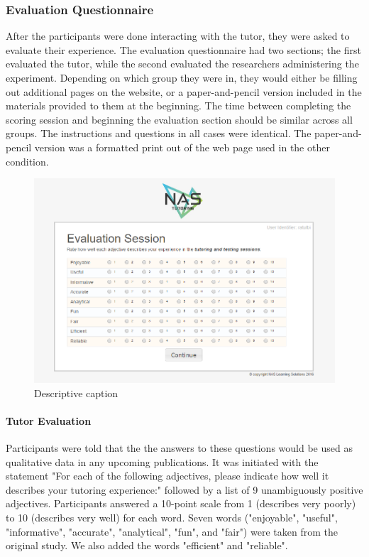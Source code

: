 \documentclass{sig-alternate-05-2015}
\begin{document}
\subsubsection{Evaluation Questionnaire}
After the participants were done interacting with the tutor, they were asked to evaluate their experience.  The evaluation questionnaire had two sections; the first evaluated the tutor, while the second evaluated the researchers administering the experiment.  Depending on which group they were in, they would either be filling out additional pages on the website, or a paper-and-pencil version included in the materials provided to them at the beginning.  The time between completing the scoring session and beginning the evaluation section should be similar across all groups.  The instructions and questions in all cases were identical.  The paper-and-pencil version was a formatted print out of the web page used in the other condition.

\begin{figure}[!h]
    \includegraphics[width=\linewidth]{figures/website/12_eval.png}
    \caption{Descriptive caption}
\end{figure}

\paragraph{Tutor Evaluation}
Participants were told that the the answers to these questions would be used as qualitative data in any upcoming publications.  It was initiated with the statement "For each of the following adjectives, please indicate how well it describes your tutoring experience:" followed by a list of 9 unambiguously positive adjectives.  Participants answered a 10-point scale from 1 (describes very poorly) to 10 (describes very well) for each word.  Seven words ("enjoyable", "useful", "informative", "accurate", "analytical", "fun", and "fair") were taken from the original study.  We also added the words "efficient" and "reliable".
\end{document}
